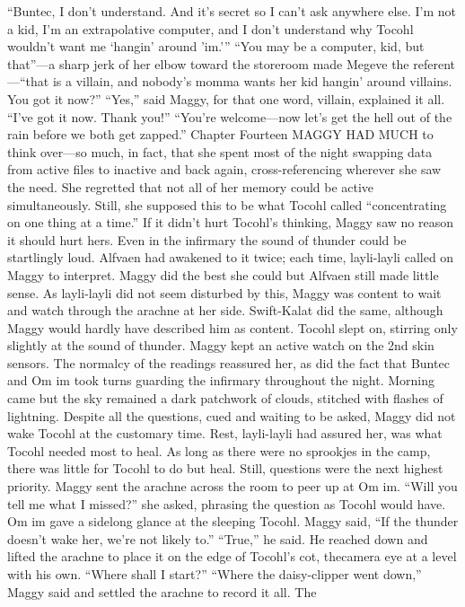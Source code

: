 \documentclass[9pt]{article}
\begin{document}
“Buntec, I don’t understand. And it’s secret so I can’t ask anywhere else. I’m not a kid, I’m an
extrapolative computer, and I don’t understand why Tocohl wouldn’t want me ‘hangin’ around ’im.’”
“You may be a computer, kid, but that”—a sharp jerk of her elbow toward the storeroom made
Megeve the referent—“that is a villain, and nobody’s momma wants her kid hangin’ around villains. You
got it now?”
“Yes,” said Maggy, for that one word, villain, explained it all. “I’ve got it now. Thank you!”
“You’re welcome—now let’s get the hell out of the rain before we both get zapped.”
Chapter Fourteen
MAGGY HAD MUCH to think over—so much, in fact, that she spent most of the night swapping
data from active files to inactive and back again, cross-referencing wherever she saw the need. She
regretted that not all of her memory could be active simultaneously. Still, she supposed this to be what
Tocohl called “concentrating on one thing at a time.” If it didn’t hurt Tocohl’s thinking, Maggy saw no
reason it should hurt hers.
Even in the infirmary the sound of thunder could be startlingly loud. Alfvaen had awakened to it
twice; each time, layli-layli called on Maggy to interpret. Maggy did the best she could but Alfvaen still
made little sense. As layli-layli did not seem disturbed by this, Maggy was content to wait and watch
through the arachne at her side. Swift-Kalat did the same, although Maggy would hardly have described
him as content.
Tocohl slept on, stirring only slightly at the sound of thunder. Maggy kept an active watch on the 2nd
skin sensors. The normalcy of the readings reassured her, as did the fact that Buntec and Om im took
turns guarding the infirmary throughout the night.
Morning came but the sky remained a dark patchwork of clouds, stitched with flashes of lightning.
Despite all the questions, cued and waiting to be asked, Maggy did not wake Tocohl at the customary
time. Rest, layli-layli had assured her, was what Tocohl needed most to heal. As long as there were no
sprookjes in the camp, there was little for Tocohl to do but heal.
Still, questions were the next highest priority. Maggy sent the arachne across the room to peer up at
Om im. “Will you tell me what I missed?” she asked, phrasing the question as Tocohl would have. Om im
gave a sidelong glance at the sleeping Tocohl. Maggy said, “If the thunder doesn’t wake her, we’re not
likely to.”
“True,” he said. He reached down and lifted the arachne to place it on the edge of Tocohl’s cot, thecamera eye at a level with his own. “Where shall I start?”
“Where the daisy-clipper went down,” Maggy said and settled the arachne to record it all. The
\end{document}
